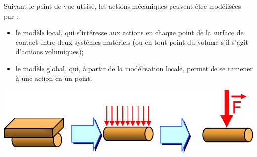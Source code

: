 \documentclass[10pt]{article}
\begin{document}
Suivant le point de vue utilisé, les actions mécaniques peuvent être modélisées par : 
\begin{itemize}
\item le modèle local, qui s'intéresse aux actions en chaque point de la surface de contact entre deux systèmes matériels (ou en tout point du volume s'il s'agit d'actions volumiques);
\item le modèle global, qui, à partir de la modélisation locale, permet de se ramener à une action en un point. 
\end{itemize}

\begin{center}
\includegraphics[width=.5\textwidth]{images/local_global}
\end{center}
\end{document}
